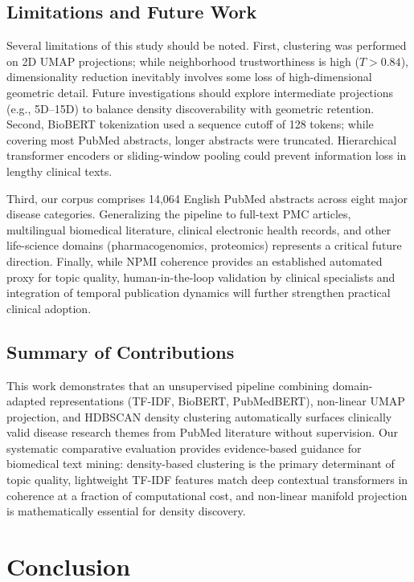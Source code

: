 \documentclass[a4paper,10pt,conference]{IEEEtran}
\begin{document}
\subsection{Limitations and Future Work}

Several limitations of this study should be noted. First, clustering was performed on 2D UMAP projections; while neighborhood trustworthiness is high ($T > 0.84$), dimensionality reduction inevitably involves some loss of high-dimensional geometric detail. Future investigations should explore intermediate projections (e.g., 5D--15D) to balance density discoverability with geometric retention. Second, BioBERT tokenization used a sequence cutoff of 128 tokens; while covering most PubMed abstracts, longer abstracts were truncated. Hierarchical transformer encoders or sliding-window pooling could prevent information loss in lengthy clinical texts.

Third, our corpus comprises 14,064 English PubMed abstracts across eight major disease categories. Generalizing the pipeline to full-text PMC articles, multilingual biomedical literature, clinical electronic health records, and other life-science domains (pharmacogenomics, proteomics) represents a critical future direction. Finally, while NPMI coherence provides an established automated proxy for topic quality, human-in-the-loop validation by clinical specialists and integration of temporal publication dynamics will further strengthen practical clinical adoption.

\subsection{Summary of Contributions}

This work demonstrates that an unsupervised pipeline combining domain-adapted representations (TF-IDF, BioBERT, PubMedBERT), non-linear UMAP projection, and HDBSCAN density clustering automatically surfaces clinically valid disease research themes from PubMed literature without supervision. Our systematic comparative evaluation provides evidence-based guidance for biomedical text mining: density-based clustering is the primary determinant of topic quality, lightweight TF-IDF features match deep contextual transformers in coherence at a fraction of computational cost, and non-linear manifold projection is mathematically essential for density discovery.

\section{Conclusion}
\end{document}
